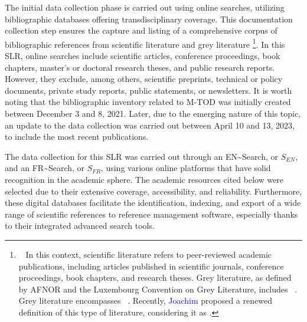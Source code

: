 \begin{refsegment}
The initial data collection phase is carried out using online searches, utilizing bibliographic databases offering transdisciplinary coverage. This documentation collection step ensures the capture and listing of a comprehensive corpus of bibliographic references from scientific literature and grey literature
    \footnote{~
        In this context, scientific literature refers to peer-reviewed academic publications, including articles published in scientific journals, conference proceedings, book chapters, and research theses. Grey literature, as defined by \acrfull{AFNOR} and the Luxembourg Convention on Grey Literature, includes ~\textcolor{blue}{\autocite[30]{schopfel_comprendre_2015}}. Grey literature encompasses ~\textcolor{blue}{\autocite{national_grey_literature_collection_luxembourg_nodate}}. Recently, \textcolor{blue}{Joachim} \textcolor{blue}{\textcite[9]{schopfel_vers_2012}} proposed a renewed definition of this type of literature, considering it as .
}. In this \acrshort{SLR}, online searches include scientific articles, conference proceedings, book chapters, master's or doctoral research theses, and public research reports. However, they exclude, among others, scientific preprints, technical or policy documents, private study reports, public statements, or newsletters. It is worth noting that the bibliographic inventory related to \acrshort{M-TOD} was initially created between December 3 and 8, 2021. Later, due to the emerging nature of this topic, an update to the data collection was carried out between April 10 and 13, 2023, to include the most recent publications.%

The data collection for this \acrshort{SLR} was carried out through an \acrfull{EN~Search}, or \(S_{EN}\), and an \acrfull{FR~Search}, or \(S_{FR}\), using various online platforms that have solid recognition in the academic sphere. The academic resources cited below were selected due to their extensive coverage, accessibility, and reliability. Furthermore, these digital databases facilitate the identification, indexing, and export of a wide range of scientific references to reference management software, especially thanks to their integrated advanced search tools.%


\end{refsegment}
